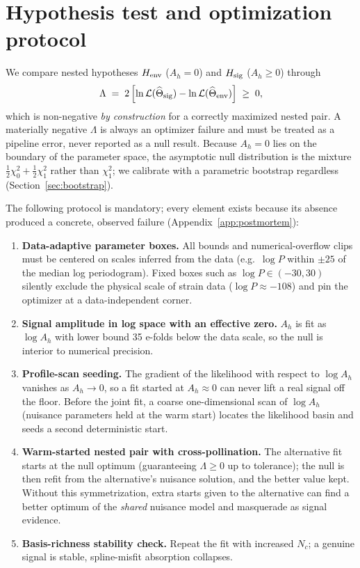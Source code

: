 \documentclass[11pt]{article}
\newcommand{\Ah}{A_h}
\begin{document}
\section{Hypothesis test and optimization protocol}
\label{sec:inference}

We compare nested hypotheses $H_{\rm env}$ ($\Ah = 0$) and $H_{\rm sig}$ ($\Ah \ge 0$) through
\begin{equation}
\Lambda \;=\; 2\left[ \ln \mathcal{L}(\widehat{\Theta}_{\rm sig}) - \ln \mathcal{L}(\widehat{\Theta}_{\rm env}) \right] \;\ge\; 0,
\end{equation}
which is non-negative \emph{by construction} for a correctly maximized nested pair. A materially negative $\Lambda$ is always an optimizer failure and must be treated as a pipeline error, never reported as a null result. Because $\Ah = 0$ lies on the boundary of the parameter space, the asymptotic null distribution is the mixture $\tfrac{1}{2}\chi^2_0 + \tfrac{1}{2}\chi^2_1$ rather than $\chi^2_1$; we calibrate with a parametric bootstrap regardless (Section~\ref{sec:bootstrap}).

The following protocol is mandatory; every element exists because its absence produced a concrete, observed failure (Appendix~\ref{app:postmortem}):
\begin{enumerate}
\item \textbf{Data-adaptive parameter boxes.} All bounds and numerical-overflow clips must be centered on scales inferred from the data (e.g.\ $\log P$ within $\pm 25$ of the median log periodogram). Fixed boxes such as $\log P \in (-30, 30)$ silently exclude the physical scale of strain data ($\log P \approx -108$) and pin the optimizer at a data-independent corner.
\item \textbf{Signal amplitude in log space with an effective zero.} $\Ah$ is fit as $\log \Ah$ with lower bound 35 e-folds below the data scale, so the null is interior to numerical precision.
\item \textbf{Profile-scan seeding.} The gradient of the likelihood with respect to $\log \Ah$ vanishes as $\Ah \to 0$, so a fit started at $\Ah \approx 0$ can never lift a real signal off the floor. Before the joint fit, a coarse one-dimensional scan of $\log \Ah$ (nuisance parameters held at the warm start) locates the likelihood basin and seeds a second deterministic start.
\item \textbf{Warm-started nested pair with cross-pollination.} The alternative fit starts at the null optimum (guaranteeing $\Lambda \ge 0$ up to tolerance); the null is then refit from the alternative's nuisance solution, and the better value kept. Without this symmetrization, extra starts given to the alternative can find a better optimum of the \emph{shared} nuisance model and masquerade as signal evidence.
\item \textbf{Basis-richness stability check.} Repeat the fit with increased $N_c$; a genuine signal is stable, spline-misfit absorption collapses.
\end{enumerate}
\end{document}
